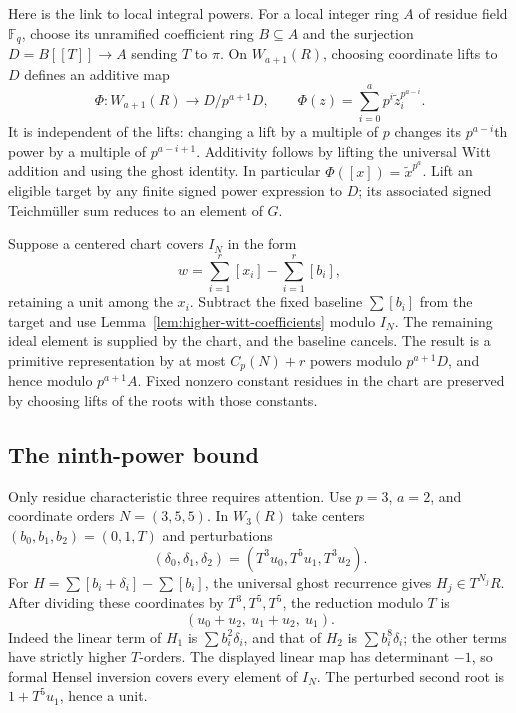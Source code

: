 \documentclass[11pt,reqno]{amsart}
\numberwithin{equation}{section}
\theoremstyle{definition}
\begin{document}
Here is the link to local integral powers. For a local integer ring
$A$ of residue field $\mathbb F_q$, choose its unramified coefficient
ring $B\subseteq A$ and the surjection $D=B[[T]]\to A$ sending
$T$ to $\pi$. On $W_{a+1}(R)$, choosing coordinate lifts to $D$
defines an additive map
\begin{equation}\label{eq:higher-last-ghost}
 \Phi:W_{a+1}(R)\longrightarrow D/p^{a+1}D,
 \qquad \Phi(z)=\sum_{i=0}^a p^i\widetilde z_i^{p^{a-i}}.
\end{equation}
It is independent of the lifts: changing a lift by a multiple of
$p$ changes its $p^{a-i}$th power by a multiple of $p^{a-i+1}$.
Additivity follows by lifting the universal Witt addition and using
the ghost identity. In particular $\Phi([x])=\widetilde x^{p^a}$.
Lift an eligible target by any finite signed power expression to
$D$; its associated signed Teichm\"uller sum reduces to an element
of $G$.

Suppose a centered chart covers $I_N$ in the form
\[
 w=\sum_{i=1}^r[x_i]-\sum_{i=1}^r[b_i],
\]
retaining a unit among the $x_i$. Subtract the fixed baseline
$\sum[b_i]$ from the target and use Lemma~\ref{lem:higher-witt-coefficients}
modulo $I_N$. The remaining ideal element is supplied by the chart,
and the baseline cancels. The result is a primitive representation
by at most $C_p(N)+r$ powers modulo $p^{a+1}D$, and hence modulo
$p^{a+1}A$. Fixed nonzero constant residues in the chart are
preserved by choosing lifts of the roots with those constants.

\subsection{The ninth-power bound}
\label{sec:higher-ninth-local}

Only residue characteristic three requires attention. Use $p=3$,
$a=2$, and coordinate orders $N=(3,5,5)$. In $W_3(R)$ take centers
$(b_0,b_1,b_2)=(0,1,T)$ and perturbations
\[
 (\delta_0,\delta_1,\delta_2)
       =(T^3u_0,T^5u_1,T^3u_2).
\]
For $H=\sum[b_i+\delta_i]-\sum[b_i]$, the universal ghost
recurrence gives $H_j\in T^{N_j}R$. After dividing these coordinates
by $T^3,T^5,T^5$, the reduction modulo $T$ is
\[
 (u_0+u_2,\ u_1+u_2,\ u_1).
\]
Indeed the linear term of $H_1$ is $\sum b_i^2\delta_i$, and that
of $H_2$ is $\sum b_i^8\delta_i$; the other terms have strictly
higher $T$-orders. The displayed linear map has determinant $-1$,
so formal Hensel inversion covers every element of $I_N$.
The perturbed second root is $1+T^5u_1$, hence a unit.
\end{document}
